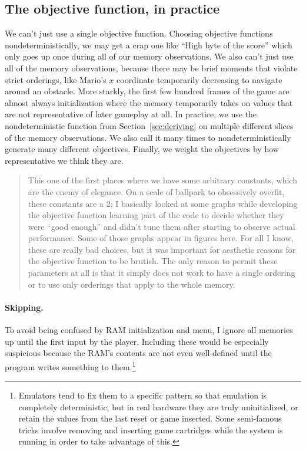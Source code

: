 \documentclass[twocolumn]{article}
\newcommand\parameteralert[1]{
  \begin{quotation}
  \noindent {\bf Parameter Alert!} #1
  \end{quotation}
}
\begin{document}
\subsection{The objective function, in practice}

We can't just use a single objective function. Choosing objective
functions nondeterministically, we may get a crap one like ``High byte
of the score'' which only goes up once during all of our memory
observations. We also can't just use all of the memory observations,
because there may be brief moments that violate strict orderings, like
Mario's $x$ coordinate temporarily decreasing to navigate around an
obstacle. More starkly, the first few hundred frames of the game are
almost always initialization where the memory temporarily takes on
values that are not representative of later gameplay at all. In
practice, we use the nondeterministic function from
Section~\ref{sec:deriving} on multiple different slices of the memory
observations. We also call it many times to nondeterministically
generate many different objectives. Finally, we weight the objectives
by how representative we think they are.

\parameteralert{This one of the first places where we have some
  arbitrary constants, which are the enemy of elegance. On a scale of
  ballpark to obsessively overfit, these constants are a 2; I
  basically looked at some graphs while developing the objective
  function learning part of the code to decide whether they were
  ``good enough'' and didn't tune them after starting to observe
  actual performance. Some of those graphs appear in figures here.
  For all I know, these are really bad choices, but it was important
  for aesthetic reasons for the objective function to be brutish. The
  only reason to permit these parameters at all is that it simply
  does not work to have a single ordering or to use only orderings
  that apply to the whole memory.}

\paragraph{Skipping.} To avoid being confused by RAM initialization and
menu, I ignore all memories up until the first input by the player.
Including these would be especially suspicious because the RAM's
contents are not even well-defined until the program writes something
to them.\footnote{Emulators tend to fix them to a specific pattern so
  that emulation is completely deterministic, but in real hardware
  they are truly uninitialized, or retain the values from the last
  reset or game inserted. Some semi-famous tricks involve removing and
  inserting game cartridges while the system is running in order to
  take advantage of this.}
\end{document}
